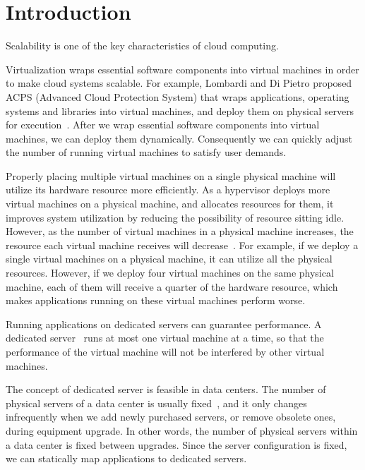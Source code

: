 \chapter{Introduction}

Scalability is one of the key characteristics of cloud computing.

Virtualization wraps essential software components into virtual machines
in order to make cloud systems scalable.
For example, Lombardi and Di Pietro proposed ACPS (Advanced Cloud
Protection System) that wraps applications, operating systems and
libraries into virtual machines, and deploy them on physical servers for
execution~\cite{cite:secure_virt_for_cloud, cite:cloud_issue}.
After we wrap essential software components into virtual machines, we
can deploy them dynamically.
Consequently we can quickly adjust the number of running virtual
machines to satisfy user demands.

Properly placing multiple virtual machines on a single physical machine
will utilize its hardware resource more efficiently.
As a hypervisor deploys more virtual machines on a physical machine, and
allocates resources for them, it improves system utilization by reducing
the possibility of resource sitting idle.
However, as the number of virtual machines in a physical machine
increases, the resource each virtual machine receives will
decrease~\cite{cite:resource_overbooking}.
For example, if we deploy a single virtual machines on a physical
machine, it can utilize all the physical resources.
However, if we deploy four virtual machines on the same physical
machine, each of them will receive a quarter of the hardware resource,
which makes applications running on these virtual machines perform
worse.

Running applications on dedicated servers can guarantee performance.
A dedicated server~\cite{cite:dedicated_hosting} runs at most one
virtual machine at a time, so that the performance of the virtual
machine will not be interfered by other virtual machines.

The concept of dedicated server is feasible in data centers.
The number of physical servers of a data center is usually
fixed~\cite{cite:maintenance_framework}, and it only changes
infrequently when we add newly purchased servers, or remove obsolete
ones, during equipment upgrade.
In other words, the number of physical servers within a data center is
fixed between upgrades.
Since the server configuration is fixed, we can statically map
applications to dedicated servers.

